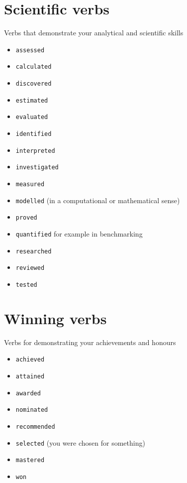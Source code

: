 \documentclass[
]{book}
\providecommand{\tightlist}{%
  \setlength{\itemsep}{0pt}\setlength{\parskip}{0pt}}
\begin{document}
\hypertarget{scientific}{%
\section{Scientific verbs}\label{scientific}}

Verbs that demonstrate your analytical and scientific skills

\begin{itemize}
\tightlist
\item
  \texttt{assessed}
\item
  \texttt{calculated}
\item
  \texttt{discovered}
\item
  \texttt{estimated}
\item
  \texttt{evaluated}
\item
  \texttt{identified}
\item
  \texttt{interpreted}
\item
  \texttt{investigated}
\item
  \texttt{measured}
\item
  \texttt{modelled} (in a computational or mathematical sense)
\item
  \texttt{proved}
\item
  \texttt{quantified} for example in benchmarking
\item
  \texttt{researched}~\\
\item
  \texttt{reviewed}
\item
  \texttt{tested}
\end{itemize}

\hypertarget{winning}{%
\section{Winning verbs}\label{winning}}

Verbs for demonstrating your achievements and honours

\begin{itemize}
\tightlist
\item
  \texttt{achieved}
\item
  \texttt{attained}
\item
  \texttt{awarded}
\item
  \texttt{nominated}
\item
  \texttt{recommended}
\item
  \texttt{selected} (you were chosen for something)
\item
  \texttt{mastered}
\item
  \texttt{won}
\end{itemize}
\end{document}

